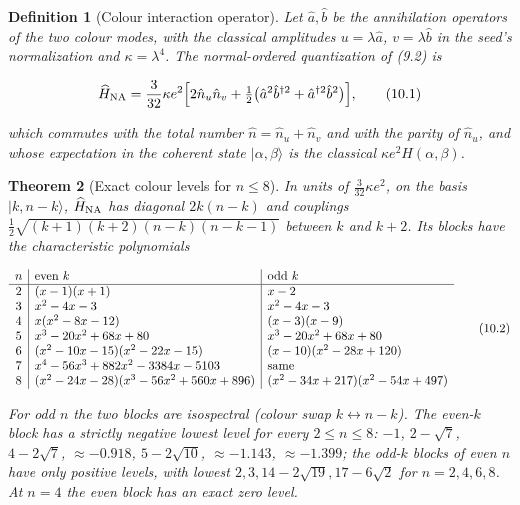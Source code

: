 \documentclass[11pt]{article}
\newtheorem{theorem}{Theorem}[section]
\newtheorem{definition}[theorem]{Definition}
\theoremstyle{remark}
\begin{document}
\begin{definition}[Colour interaction operator]
\label{def:v20v7-operator}
Let \(\hat a,\hat b\) be the annihilation operators of the two colour
modes, with the classical amplitudes \(u=\lambda\hat a\), \(v=\lambda\hat b\)
in the seed's normalization and \(\kappa=\lambda^4\).  The normal-ordered
quantization of (9.2) is

\[
 \widehat H_{\rm NA}=\frac3{32}\kappa e^2\Bigl[2\hat n_u\hat n_v+\tfrac12\bigl(\hat a^2\hat b^{\dagger2}+\hat a^{\dagger2}\hat b^2\bigr)\Bigr],
                                                                    \tag{10.1}
\]

which commutes with the total number \(\hat n=\hat n_u+\hat n_v\) and
with the parity of \(\hat n_u\), and whose expectation in the
coherent state \(|\alpha,\beta\rangle\) is the classical
\(\kappa e^2H(\alpha,\beta)\).
\end{definition}

\begin{theorem}[Exact colour levels for \(n\leq8\)]
\label{thm:v20v7-levels}
In units of \(\tfrac3{32}\kappa e^2\), on the basis \(|k,n-k\rangle\),
\(\widehat H_{\rm NA}\) has diagonal \(2k(n-k)\) and couplings
\(\tfrac12\sqrt{(k+1)(k+2)(n-k)(n-k-1)}\) between \(k\) and \(k+2\).
Its blocks have the characteristic polynomials

\[
\begin{array}{c|l|l}
n&\hbox{even }k&\hbox{odd }k\\ \hline
2&(x-1)(x+1)&x-2\\
3&x^2-4x-3&x^2-4x-3\\
4&x(x^2-8x-12)&(x-3)(x-9)\\
5&x^3-20x^2+68x+80&x^3-20x^2+68x+80\\
6&(x^2-10x-15)(x^2-22x-15)&(x-10)(x^2-28x+120)\\
7&x^4-56x^3+882x^2-3384x-5103&\hbox{same}\\
8&(x^2-24x-28)(x^3-56x^2+560x+896)&(x^2-34x+217)(x^2-54x+497)
\end{array}                                                            \tag{10.2}
\]

For odd \(n\) the two blocks are isospectral (colour swap
\(k\leftrightarrow n-k\)).  The even-\(k\) block has a strictly negative
lowest level for every \(2\leq n\leq8\): \(-1\), \(2-\sqrt7\),
\(4-2\sqrt7\), \(\approx-0.918\), \(5-2\sqrt{10}\), \(\approx-1.143\),
\(\approx-1.399\); the odd-\(k\) blocks of even \(n\) have only positive
levels, with lowest \(2,3,14-2\sqrt{19},17-6\sqrt2\) for
\(n=2,4,6,8\).  At \(n=4\) the even block has an exact zero level.
\end{theorem}
\end{document}
